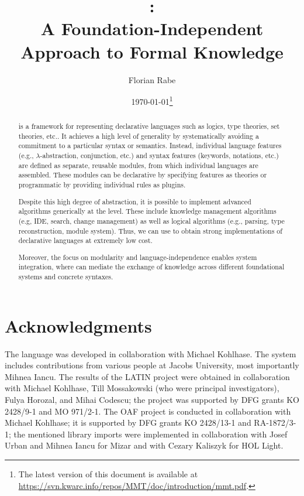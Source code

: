 \documentclass[12pt]{article}
\begin{document}
\title{\mmt:\\ A Foundation-Independent Approach to Formal Knowledge}
\author{Florian Rabe}
\date{\today\footnote{The latest version of this document is available at \url{https://svn.kwarc.info/repos/MMT/doc/introduction/mmt.pdf}.}}
\maketitle

\begin{abstract}
\mmt is a framework for representing declarative languages such as logics, type theories, set theories, etc..
It achieves a high level of generality by systematically avoiding a commitment to a particular syntax or semantics.
Instead, individual language features (e.g., $\lambda$-abstraction, conjunction, etc.) and syntax features (keywords, notations, etc.) are defined as separate, reusable modules, from which individual languages are assembled.
These modules can be declarative by specifying features as \mmt theories or programmatic by providing individual rules as plugins.

Despite this high degree of abstraction, it is possible to implement advanced algorithms generically at the \mmt level.
These include knowledge management algorithms (e.g, IDE, search, change management) as well as logical algorithms (e.g., parsing, type reconstruction, module system).
Thus, we can use \mmt to obtain strong implementations of declarative languages at extremely low cost.

Moreover, the focus on modularity and language-independence enables system integration, where \mmt can mediate the exchange of knowledge across different foundational systems and concrete syntaxes.
\end{abstract}



\section*{Acknowledgments}

The \mmt language was developed in collaboration with Michael Kohlhase.
The \mmt system includes contributions from various people at Jacobs University, most importantly Mihnea Iancu.
The results of the LATIN project were obtained in collaboration with Michael Kohlhase, Till Mossakowski (who were principal investigators), Fulya Horozal, and Mihai Codescu; the project was supported by DFG grants KO 2428/9-1 and MO 971/2-1.
The OAF project is conducted in collaboration with Michael Kohlhase; it is supported by DFG grants KO 2428/13-1 and RA-1872/3-1; the mentioned library imports were implemented in collaboration with Josef Urban and Mihnea Iancu for Mizar and with Cezary Kaliszyk for HOL Light.



\end{document}
